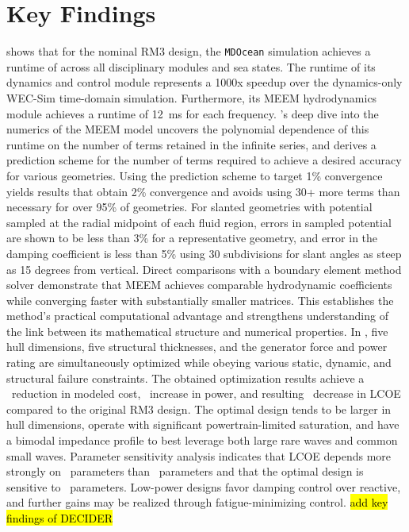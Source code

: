 \section{Key Findings}
 shows that for the nominal RM3 design, the \texttt{MDOcean} simulation achieves a runtime of \resultsAOR[simRuntime] across all disciplinary modules and sea states.
The runtime of its dynamics and control module represents a 1000x speedup over the dynamics-only WEC-Sim time-domain simulation.
Furthermore, its MEEM hydrodynamics module achieves a runtime of 12~ms for each frequency.
's deep dive into the numerics of the MEEM model uncovers the polynomial dependence of this runtime on the number of terms retained in the infinite series,
and derives a prediction scheme for the number of terms required to achieve a desired accuracy for various geometries. 
Using the prediction scheme to target 1\% convergence yields results that obtain 2\% convergence and avoids using 30+ more terms than necessary for over 95\% of geometries.
For slanted geometries with potential sampled at the radial midpoint of each fluid region, errors in sampled potential are shown to be less than 3\% for a representative geometry,
and error in the damping coefficient is less than 5\% using 30 subdivisions for slant angles as steep as 15 degrees from vertical.
Direct comparisons with a boundary element method solver demonstrate that MEEM achieves comparable hydrodynamic coefficients while converging faster with substantially smaller matrices.
This establishes the method's practical computational advantage and strengthens understanding of the link between its mathematical structure and numerical properties.
In , five hull dimensions, five structural thicknesses, and the generator force and power rating are simultaneously optimized while obeying various static, dynamic, and structural failure constraints.
The obtained optimization results achieve a \resultsRE[pctImproveDesignCostMinLCOE]~reduction in modeled cost, \resultsRE[pctImprovePowerMinLCOE]~increase in power, and resulting \resultsRE[pctImproveLCOEMinLCOE]~decrease in LCOE compared to the original RM3 design.
The optimal design tends to be larger in hull dimensions, operate with significant powertrain-limited saturation, and have a bimodal impedance profile to best leverage both large rare waves and common small waves.
Parameter sensitivity analysis indicates that LCOE depends more strongly on \resultsRE[sensitiveParamCategoriesMinLCOE]~parameters than \resultsRE[insensitiveParamCategoriesMinLCOE]~parameters and that the optimal design is sensitive to \resultsRE[sensitiveDesignCategoriesMinLCOE]~parameters.
Low-power designs favor damping control over reactive, and further gains may be realized through fatigue-minimizing control.
\ifdefined\DECIDER
    \hl{add key findings of DECIDER}
\fi
